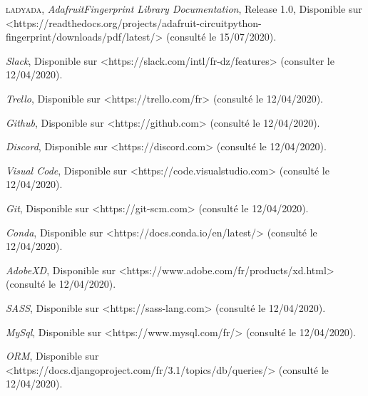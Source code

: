 \begin{thebibliography}{2}
         \textsc{ladyada}, \emph{AdafruitFingerprint Library Documentation}, Release 1.0, Disponible sur \\<https://readthedocs.org/projects/adafruit-circuitpython-fingerprint/downloads/pdf/latest/> (consulté le 15/07/2020).
        
        \emph{Slack}, Disponible sur <https://slack.com/intl/fr-dz/features> (consulter le 12/04/2020).
        
        \emph{Trello}, Disponible sur <https://trello.com/fr> (consulté le 12/04/2020).
        
        \emph{Github}, Disponible sur <https://github.com> (consulté le 12/04/2020).
        
        \emph{Discord}, Disponible sur <https://discord.com> (consulté le 12/04/2020).
        
        \emph{Visual Code}, Disponible sur <https://code.visualstudio.com> (consulté le 12/04/2020).
        
        \emph{Git}, Disponible sur <https://git-scm.com> (consulté le 12/04/2020).
        
        \emph{Conda}, Disponible sur <https://docs.conda.io/en/latest/> (consulté le 12/04/2020).
        
        \emph{AdobeXD}, Disponible sur <https://www.adobe.com/fr/products/xd.html> (consulté le 12/04/2020).
        
        \emph{SASS}, Disponible sur <https://sass-lang.com> (consulté le 12/04/2020).
        
        \emph{MySql}, Disponible sur <https://www.mysql.com/fr/> (consulté le 12/04/2020).
        
        \emph{ORM}, Disponible sur <https://docs.djangoproject.com/fr/3.1/topics/db/queries/> (consulté le 12/04/2020).

		
\end{thebibliography}